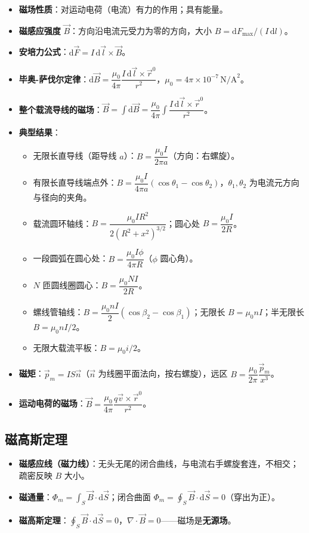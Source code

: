 \documentclass[12pt,a4paper]{ctexart}
\begin{document}
\begin{itemize}
    \item \textbf{磁场性质}：对运动电荷（电流）有力的作用；具有能量。
    \item \textbf{磁感应强度} $\vec B$：方向沿电流元受力为零的方向，大小 $B=\mathrm dF_\text{max}/(I\,\mathrm dl)$。
    \item \textbf{安培力公式}：$\mathrm d\vec F=I\,\mathrm d\vec l\times\vec B$。
    \item \textbf{毕奥-萨伐尔定律}：$\mathrm d\vec B=\dfrac{\mu_0}{4\pi}\dfrac{I\,\mathrm d\vec l\times\vec r^0}{r^2}$，$\mu_0=4\pi\times10^{-7}\,\text{N/A}^2$。
    \item \textbf{整个载流导线的磁场}：$\vec B=\displaystyle\int\mathrm d\vec B=\dfrac{\mu_0}{4\pi}\displaystyle\int\dfrac{I\,\mathrm d\vec l\times\vec r^0}{r^2}$。
    \item \textbf{典型结果}：
    \begin{itemize}
        \item 无限长直导线（距导线 $a$）：$B=\dfrac{\mu_0 I}{2\pi a}$（方向：右螺旋）。
        \item 有限长直导线端点外：$B=\dfrac{\mu_0 I}{4\pi a}(\cos\theta_1-\cos\theta_2)$，$\theta_1,\theta_2$ 为电流元方向与径向的夹角。
        \item 载流圆环轴线：$B=\dfrac{\mu_0 IR^2}{2(R^2+x^2)^{3/2}}$；圆心处 $B=\dfrac{\mu_0 I}{2R}$。
        \item 一段圆弧在圆心处：$B=\dfrac{\mu_0 I\phi}{4\pi R}$（$\phi$ 圆心角）。
        \item $N$ 匝圆线圈圆心：$B=\dfrac{\mu_0 NI}{2R}$。
        \item 螺线管轴线：$B=\dfrac{\mu_0 nI}{2}(\cos\beta_2-\cos\beta_1)$；无限长 $B=\mu_0 nI$；半无限长 $B=\mu_0 nI/2$。
        \item 无限大载流平板：$B=\mu_0 i/2$。
    \end{itemize}
    \item \textbf{磁矩}：$\vec p_m=I S\vec n$（$\vec n$ 为线圈平面法向，按右螺旋），远区 $B=\dfrac{\mu_0}{2\pi}\dfrac{\vec p_m}{x^3}$。
    \item \textbf{运动电荷的磁场}：$\vec B=\dfrac{\mu_0}{4\pi}\dfrac{q\vec v\times\vec r^0}{r^2}$。
\end{itemize}

\subsection{磁高斯定理}

\begin{itemize}
    \item \textbf{磁感应线（磁力线）}：无头无尾的闭合曲线，与电流右手螺旋套连，不相交；疏密反映 $B$ 大小。
    \item \textbf{磁通量}：$\Phi_m=\displaystyle\int_S\vec B\cdot\mathrm d\vec S$；闭合曲面 $\Phi_m=\displaystyle\oint_S\vec B\cdot\mathrm d\vec S=0$（穿出为正）。
    \item \textbf{磁高斯定理}：$\displaystyle\oint_S\vec B\cdot\mathrm d\vec S=0$，$\nabla\cdot\vec B=0$——磁场是\textbf{无源场}。
\end{itemize}
\end{document}
